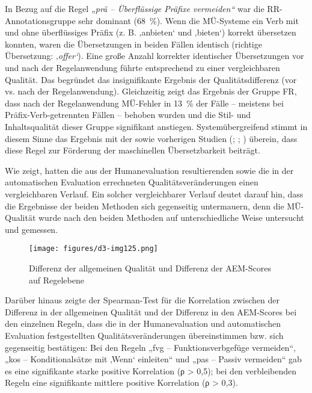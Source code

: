 In Bezug auf die Regel \textit{„prä -- Überflüssige Präfixe vermeiden“} war die RR-Annotationsgruppe sehr dominant (68~\%). Wenn die MÜ-Systeme ein Verb mit und ohne überflüssiges Präfix (z. B. ‚anbieten‘ und ‚bieten‘) korrekt übersetzen konnten, waren die Übersetzungen in beiden Fällen identisch (richtige Übersetzung: ‚\textit{offer‘}). Eine große Anzahl korrekter identischer Übersetzungen vor und nach der Regelanwendung führte entsprechend zu einer vergleichbaren Qualität. Das begründet das insignifikante Ergebnis der Qualitätsdifferenz (vor vs. nach der Regelanwendung). Gleichzeitig zeigt das Ergebnis der Gruppe FR, dass nach der Regelanwendung MÜ-Fehler in 13~\% der Fälle -- meistens bei Präfix-Verb-getrennten Fällen -- behoben wurden und die Stil- und Inhaltsqualität dieser Gruppe signifikant anstiegen. Systemübergreifend stimmt in diesem Sinne das Ergebnis mit der \citet[111]{tekom2013} sowie vorherigen Studien (\citealt{BernthGdaniec2001}; \citealt{Siegel2011}; \citealt{Siegel2013}) überein, dass diese Regel zur Förderung der maschinellen Übersetzbarkeit beiträgt.

Wie  zeigt, hatten die aus der Humanevaluation resultierenden sowie die in der automatischen Evaluation errechneten Qualitätsveränderungen einen vergleichbaren Verlauf. Ein solcher vergleichbarer Verlauf deutet darauf hin, dass die Ergebnisse der beiden Methoden sich gegenseitig untermauern, denn die MÜ-Qualität wurde nach den beiden Methoden auf unterschiedliche Weise untersucht und gemessen.

\begin{figure}
\texttt{[image: figures/d3-img125.png]}







\caption{\label{fig:06:152} Differenz der allgemeinen Qualität und Differenz der AEM-Scores auf Regelebene}
\end{figure}

Darüber hinaus zeigte der Spearman-Test für die Korrelation zwischen der Differenz in der allgemeinen Qualität und der Differenz in den AEM-Scores bei den einzelnen Regeln, dass die in der Humanevaluation und automatischen Evaluation festgestellten Qualitätsveränderungen übereinstimmen bzw. sich gegenseitig bestätigen: Bei den Regeln „fvg -- Funktionsverbgefüge vermeiden“, „kos -- Konditionalsätze mit ‚Wenn‘ einleiten“ und „pas -- Passiv vermeiden“ gab es eine signifikante starke positive Korrelation (ρ > 0,5); bei den verbleibenden Regeln eine signifikante mittlere positive Korrelation (ρ > 0,3).

